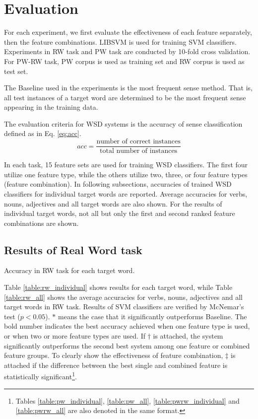 \documentclass[english]{jnlp_1.4}
\begin{document}
\section{Evaluation} \label{section:eval}
For each experiment, we first evaluate the effectiveness of each feature separately, 
then the feature combinations.
LIBSVM \cite{LibSVM} is used for training SVM classifiers. 
Experiments in RW task and PW task are conducted by 10-fold cross validation.
For PW-RW task, PW corpus is used as training set and RW corpus is used as test set.

The Baseline used in the experiments is the most frequent sense method. 
That is, all test instances of a target word are determined to be the most frequent sense appearing in the training data. 

The evaluation criteria for WSD systems is the accuracy of sense classification defined as in Eq. \eqref{eq:acc}.
\begin{equation}\label{eq:acc}
 acc=\frac{\text{number of correct instances}}{\text{total number of instances}} 
\end{equation}

In each task, 
15
feature sets are used for training WSD classifiers.
The first four utilize one feature type, 
while the others utilize two, 
three, or 
four
feature types (feature combination).
In following subsections, accuracies of trained WSD classifiers for individual target words are reported. 
Average accuracies for verbs, nouns, adjectives and all target words are also shown.
For the results of individual target words, 
not all but only the first and second ranked feature combinations are shown.


\subsection{Results of Real Word task}
\label{exp_rw}

\begin{table}[b]
\caption{Accuracy in RW task for each target word.}
\label{table:rw_individual}

\end{table}

Table \ref{table:rw_individual} shows results for each target word,
while Table \ref{table:rw_all} shows the average accuracies for verbs, nouns, adjectives and all target words in RW task.
Results of SVM classifiers are verified by McNemar's test ($p<0.05$).
$*$ means the case that it significantly outperforms Baseline. 
The bold number indicates the best accuracy achieved when one feature type is used, 
or when two or more feature types are used. 
If $\dagger$ is attached, 
the system significantly outperforms the second best system
among one feature or combined feature groups.
To clearly show the effectiveness of feature combination,
$\ddagger$ is attached if the difference between the best single and combined feature is statistically significant\footnote{Tables \ref{table:pw_individual}, \ref{table:pw_all}, \ref{table:pwrw_individual} and \ref{table:pwrw_all} are also denoted in the same format.}.
\end{document}
